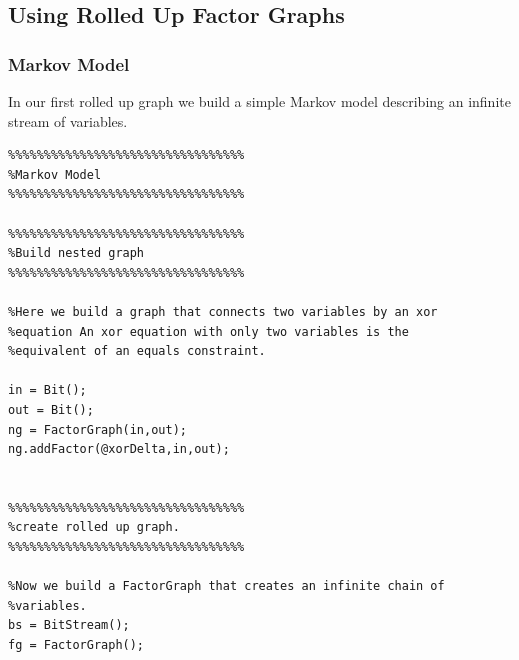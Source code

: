 
\subsection{Using Rolled Up Factor Graphs}
\label{sec:rolledUpFactorGraphs}


\subsubsection{Markov Model}

In our first rolled up graph we build a simple Markov model describing an infinite stream of variables.   

\ifmatlab

\begin{lstlisting}
%%%%%%%%%%%%%%%%%%%%%%%%%%%%%%%%%                                                                                             
%Markov Model                                                                                                                 
%%%%%%%%%%%%%%%%%%%%%%%%%%%%%%%%%                                                                                             

%%%%%%%%%%%%%%%%%%%%%%%%%%%%%%%%%                                                                                             
%Build nested graph                                                                                                           
%%%%%%%%%%%%%%%%%%%%%%%%%%%%%%%%%                                                                                             

%Here we build a graph that connects two variables by an xor 
%equation An xor equation with only two variables is the 
%equivalent of an equals constraint.                                                                                                 

in = Bit();
out = Bit();
ng = FactorGraph(in,out);
ng.addFactor(@xorDelta,in,out);


%%%%%%%%%%%%%%%%%%%%%%%%%%%%%%%%%                                                                                             
%create rolled up graph.                                                                                                      
%%%%%%%%%%%%%%%%%%%%%%%%%%%%%%%%%                                                                                             

%Now we build a FactorGraph that creates an infinite chain of %variables.                                                     
bs = BitStream();
fg = FactorGraph();


\end{lstlisting}
